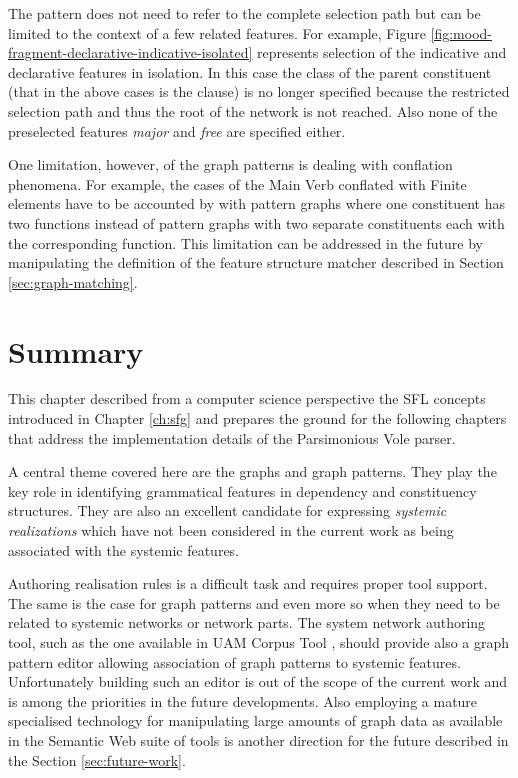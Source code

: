     The pattern does not need to refer to the complete selection path but can be limited to the context of a few related features. For example, Figure \ref{fig:mood-fragment-declarative-indicative-isolated} represents selection of the indicative and declarative features in isolation. In this case the class of the parent constituent (that in the above cases is the clause) is no longer specified because the restricted selection path and thus the root of the network is not reached. Also none of the preselected features \textit{major} and \textit{free} are specified either.  

    One limitation, however, of the graph patterns is dealing with conflation phenomena. For example, the cases of the Main Verb conflated with Finite elements have to be accounted by with pattern graphs where one constituent has two functions instead of pattern graphs with two separate constituents each with the corresponding function. This limitation can be addressed in the future by manipulating the definition of the feature structure matcher described in Section \ref{sec:graph-matching}.

\section{Summary}
    This chapter described from a computer science perspective the SFL concepts introduced in Chapter \ref{ch:sfg} and prepares the ground for the following chapters that address the implementation details of the Parsimonious Vole parser.  

    A central theme covered here are the graphs and graph patterns. They play the key role in identifying grammatical features in dependency and constituency structures. They are also an excellent candidate for expressing \textit{systemic realizations} which have not been considered in the current work as being associated with the systemic features.  

    Authoring realisation rules is a difficult task and requires proper tool support. The same is the case for graph patterns and even more so when they need to be related to systemic networks or network parts. The system network authoring tool, such as the one available in UAM Corpus Tool \citep{ODonnell2008a}, should provide also a graph pattern editor allowing association of graph patterns to systemic features. Unfortunately building such an editor is out of the scope of the current work and is among the priorities in the future developments. Also employing a mature specialised technology for manipulating large amounts of graph data as available in the Semantic Web suite of tools is another direction for the future described in the Section \ref{sec:future-work}.

